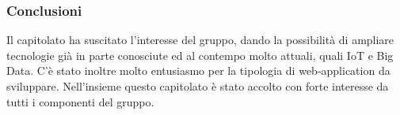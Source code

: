 	\subsubsection{Conclusioni}
	Il capitolato ha suscitato l'interesse del gruppo, dando la possibilità di ampliare tecnologie già in parte conosciute ed al contempo molto attuali, quali IoT e Big Data. C'è stato inoltre molto entusiasmo per la tipologia di web-application da sviluppare. Nell'insieme questo capitolato è stato accolto con forte interesse da tutti i componenti del gruppo.

